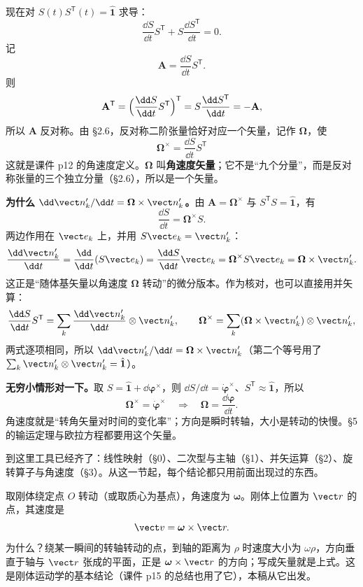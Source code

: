 \documentclass[11pt]{ctexart}
\newcommand{\ten}[1]{\mathbf{#1}}
\newcommand{\unitd}{\hat{\ten{1}}}
\let\orighdr\hdr
\renewcommand{\hdr}[2]{\par\needspace{10\baselineskip}\orighdr{#1}{#2}}
\let\origsubhdr\subhdr
\renewcommand{\subhdr}[1]{\par\needspace{3\baselineskip}\origsubhdr{#1}}
\begin{document}
现在对 $S(t)S^{\mathsf T}(t)=\unitd$ 求导：
\[
\frac{\dd S}{\dd t}S^{\mathsf T}+S\frac{\dd S^{\mathsf T}}{\dd t}=0 .
\]
记
\[
\ten A=\frac{\dd S}{\dd t}S^{\mathsf T}.
\]
则
\[
\ten A^{\mathsf T}=\Bigl(\frac{\dd S}{\dd t}S^{\mathsf T}\Bigr)^{\mathsf T}
=S\frac{\dd S^{\mathsf T}}{\dd t}=-\ten A,
\]
所以 $\ten A$ 反对称。由 §2.6，反对称二阶张量恰好对应一个矢量，记作 $\boldsymbol\Omega$，使
\[
\boxed{\;\boldsymbol\Omega^{\times}=\frac{\dd S}{\dd t}S^{\mathsf T}\;}
\]
这就是课件 p12 的角速度定义。$\boldsymbol\Omega$ 叫\textbf{角速度矢量}；它不是“九个分量”，而是反对称张量的三个独立分量（§2.6），所以是一个矢量。

\textbf{为什么 $\dd\vect n'_k/\dd t=\boldsymbol\Omega\times\vect n'_k$。}由 $\ten A=\boldsymbol\Omega^{\times}$ 与 $S^{\mathsf T}S=\unitd$，有
\[
\frac{\dd S}{\dd t}=\boldsymbol\Omega^{\times}S .
\]
两边作用在 $\vect e_k$ 上，并用 $S\vect e_k=\vect n'_k$：
\[
\frac{\dd\vect n'_k}{\dd t}=\frac{\dd}{\dd t}(S\vect e_k)=\frac{\dd S}{\dd t}\vect e_k=\boldsymbol\Omega^{\times}S\vect e_k=\boldsymbol\Omega\times\vect n'_k .
\]
这正是“随体基矢量以角速度 $\boldsymbol\Omega$ 转动”的微分版本。作为核对，也可以直接用并矢算：
\[
\frac{\dd S}{\dd t}S^{\mathsf T}
=\sum_k\frac{\dd\vect n'_k}{\dd t}\otimes\vect n'_k,
\qquad
\boldsymbol\Omega^{\times}=\sum_k(\boldsymbol\Omega\times\vect n'_k)\otimes\vect n'_k,
\]
两式逐项相同，所以 $\dd\vect n'_k/\dd t=\boldsymbol\Omega\times\vect n'_k$（第二个等号用了 $\sum_k\vect n'_k\otimes\vect n'_k=\unitd$）。

\textbf{无穷小情形对一下。}取 $S=\unitd+\dd{\boldsymbol\varphi}^{\times}$，则 $\dd S/\dd t=\dot{\boldsymbol\varphi}^{\times}$、$S^{\mathsf T}\approx\unitd$，所以
\[
\boldsymbol\Omega^{\times}=\dot{\boldsymbol\varphi}^{\times}
\quad\Longrightarrow\quad
\boldsymbol\Omega=\frac{\dd{\boldsymbol\varphi}}{\dd t}.
\]
角速度就是“转角矢量对时间的变化率”；方向是瞬时转轴，大小是转动的快慢。§5 的输运定理与欧拉方程都要用这个矢量。


到这里工具已经齐了：线性映射（§0）、二次型与主轴（§1）、并矢运算（§2）、旋转算子与角速度（§3）。从这一节起，每个结论都只用前面出现过的东西。


取刚体绕定点 $O$ 转动（或取质心为基点），角速度为 $\boldsymbol\omega$。刚体上位置为 $\vect r$ 的点，其速度是
\[
\vect v=\boldsymbol\omega\times\vect r .
\]
为什么？绕某一瞬间的转轴转动的点，到轴的距离为 $\rho$ 时速度大小为 $\omega\rho$，方向垂直于轴与 $\vect r$ 张成的平面，正是 $\boldsymbol\omega\times\vect r$ 的方向；写成矢量就是上式。这是刚体运动学的基本结论（课件 p15 的总结也用了它），本稿从它出发。
\end{document}
